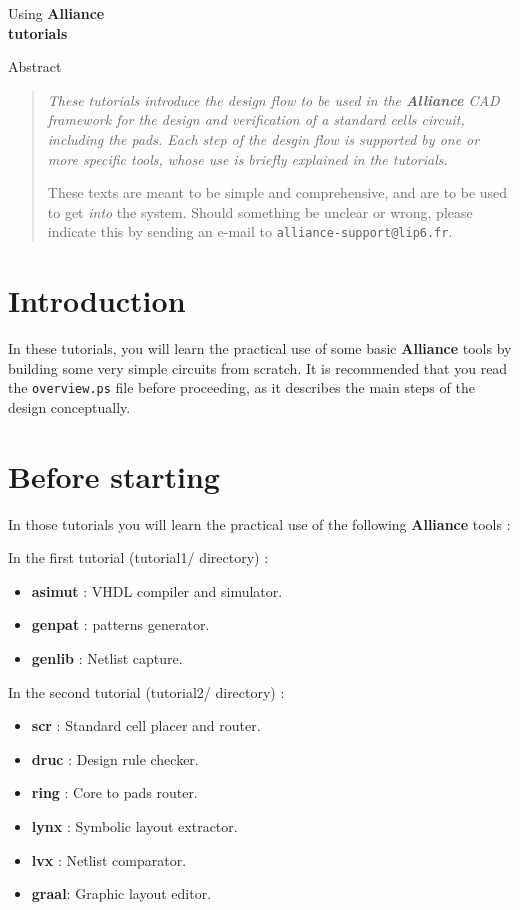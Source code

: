 \documentclass{article}
\begin{document}
\begin{center}
\Huge Using \bf Alliance\\
\Huge tutorials
\end{center}
\vspace{2cm}

%
\begin{center}
Abstract

\begin{quote}
\em
These tutorials introduce the design flow to be used in the
\textbf{Alliance} CAD framework for the design and verification of a 
standard cells circuit, including the pads.
Each step of the desgin flow is supported by one or more specific 
tools, whose use is briefly explained in the tutorials.

These texts are meant to be simple and comprehensive, and are to be used
to get \emph{into} the system.
Should something be unclear or wrong, please indicate this by sending
an e-mail to \texttt{alliance-support@lip6.fr}.
\rm
\end{quote}
\end{center}


\section{Introduction}
In these tutorials, you will learn the practical use of some basic
\textbf{Alliance} tools by building some very simple circuits from scratch.
It is recommended that you read the \texttt{overview.ps} file before
proceeding, as it describes the main steps of the design conceptually.

\section{Before starting}
In those tutorials you will learn the practical use of the following 
\textbf{Alliance} tools :

In the first tutorial (tutorial1/ directory) :
\begin{itemize}
\item \textbf{asimut} : VHDL compiler and simulator.
\item \textbf{genpat} : patterns generator.
\item \textbf{genlib} : Netlist capture.
\end{itemize}

In the second tutorial (tutorial2/ directory) :
\begin{itemize}
\item \textbf{scr}  : Standard cell placer and router.
\item \textbf{druc} : Design rule checker.
\item \textbf{ring} : Core to pads router.
\item \textbf{lynx} : Symbolic layout extractor.
\item \textbf{lvx}  : Netlist comparator.
\item \textbf{graal}: Graphic layout editor.
\end{itemize}
\end{document}
